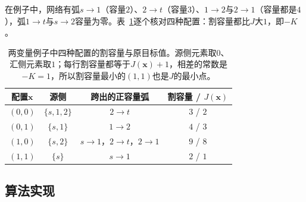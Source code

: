 在例子中，网络有弧$s\to1$（容量$2$）、$2\to t$（容量$3$）、$1\to2$与$2\to1$（容量都是$4$），弧$1\to t$与$s\to2$容量为零。表~\ref{tab:graph-setfn-cut-check}逐个核对四种配置：割容量都比$J$大$1$，即$-K$。

\begin{table}[!htb]
  \centering
  \begin{tabular}{cccc}
    \toprule
    配置$\bm x$ & 源侧 & 跨出的正容量弧 & 割容量 / $J(\bm x)$ \\
    \midrule
    $(0,0)$ & $\{s,1,2\}$ & $2\to t$ & $3$ / $2$ \\
    $(0,1)$ & $\{s,1\}$ & $1\to2$ & $4$ / $3$ \\
    $(1,0)$ & $\{s,2\}$ & $s\to1$，$2\to t$，$2\to1$ & $9$ / $8$ \\
    $(1,1)$ & $\{s\}$ & $s\to1$ & $2$ / $1$ \\
    \bottomrule
  \end{tabular}
  \caption{两变量例子中四种配置的割容量与原目标值。源侧元素取$0$、汇侧元素取$1$；每行割容量都等于$J(\bm x)+1$，相差的常数是$-K=1$，所以割容量最小的$(1,1)$也是$J$的最小点。}
  \label{tab:graph-setfn-cut-check}
\end{table}

\subsection{算法实现}
\label{sec:graph-setfn-cut-solving}

